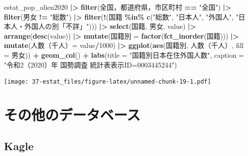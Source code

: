 \documentclass[
  xelatex, ja=standard]{bxjsbook}
\newenvironment{Shaded}{\begin{snugshade}}{\end{snugshade}}
\newcommand{\AttributeTok}[1]{\textcolor[rgb]{0.13,0.29,0.53}{#1}}
\newcommand{\DecValTok}[1]{\textcolor[rgb]{0.00,0.00,0.81}{#1}}
\newcommand{\FunctionTok}[1]{\textcolor[rgb]{0.13,0.29,0.53}{\textbf{#1}}}
\newcommand{\NormalTok}[1]{#1}
\newcommand{\OtherTok}[1]{\textcolor[rgb]{0.56,0.35,0.01}{#1}}
\newcommand{\SpecialCharTok}[1]{\textcolor[rgb]{0.81,0.36,0.00}{\textbf{#1}}}
\newcommand{\StringTok}[1]{\textcolor[rgb]{0.31,0.60,0.02}{#1}}
\theoremstyle{definition}
\theoremstyle{definition}
\theoremstyle{definition}
\theoremstyle{definition}
\theoremstyle{remark}
\begin{document}
\begin{Shaded}
\begin{Highlighting}[]
\NormalTok{estat\_pop\_alien2020 }\SpecialCharTok{|\textgreater{}} 
  \FunctionTok{filter}\NormalTok{(}\StringTok{\textasciigrave{}}\AttributeTok{全国，都道府県，市区町村}\StringTok{\textasciigrave{}} \SpecialCharTok{==} \StringTok{"全国"}\NormalTok{) }\SpecialCharTok{|\textgreater{}}
  \FunctionTok{filter}\NormalTok{(男女 }\SpecialCharTok{!=} \StringTok{"総数"}\NormalTok{) }\SpecialCharTok{|\textgreater{}}
  \FunctionTok{filter}\NormalTok{(}\SpecialCharTok{!}\NormalTok{(国籍 }\SpecialCharTok{\%in\%} \FunctionTok{c}\NormalTok{(}\StringTok{"総数"}\NormalTok{, }\StringTok{"日本人"}\NormalTok{, }\StringTok{"外国人"}\NormalTok{, }\StringTok{"日本人・外国人の別「不詳」"}\NormalTok{))) }\SpecialCharTok{|\textgreater{}}
  \FunctionTok{select}\NormalTok{(国籍, 男女, value) }\SpecialCharTok{|\textgreater{}}
  \FunctionTok{arrange}\NormalTok{(}\FunctionTok{desc}\NormalTok{(value)) }\SpecialCharTok{|\textgreater{}} 
  \FunctionTok{mutate}\NormalTok{(国籍別 }\OtherTok{=} \FunctionTok{factor}\NormalTok{(}\FunctionTok{fct\_inorder}\NormalTok{(国籍))) }\SpecialCharTok{|\textgreater{}}
  \FunctionTok{mutate}\NormalTok{(}\StringTok{\textasciigrave{}}\AttributeTok{人数（千人）}\StringTok{\textasciigrave{}}\OtherTok{=}\NormalTok{ value}\SpecialCharTok{/}\DecValTok{1000}\NormalTok{) }\SpecialCharTok{|\textgreater{}}
  \FunctionTok{ggplot}\NormalTok{(}\FunctionTok{aes}\NormalTok{(国籍別, }\StringTok{\textasciigrave{}}\AttributeTok{人数（千人）}\StringTok{\textasciigrave{}}\NormalTok{, }\AttributeTok{fill =}\NormalTok{ 男女)) }\SpecialCharTok{+} \FunctionTok{geom\_col}\NormalTok{() }\SpecialCharTok{+}
  \FunctionTok{labs}\NormalTok{(}\AttributeTok{title =} \StringTok{"国籍別日本在住外国人数"}\NormalTok{, }\AttributeTok{caption =} \StringTok{"令和2（2020）年 国勢調査 統計表表示ID=0003445244"}\NormalTok{)}
\end{Highlighting}
\end{Shaded}

\texttt{[image: 37-estat\_files/figure-latex/unnamed-chunk-19-1.pdf]}

\hypertarget{others}{%
\chapter{その他のデータベース}\label{others}}

\hypertarget{kagle}{%
\section{Kagle}\label{kagle}}
\end{document}
